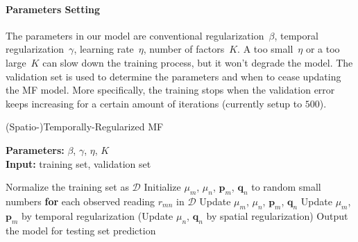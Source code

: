 \paragraph*{Parameters Setting}
The parameters in our model are conventional regularization~$\beta$, temporal regularization~$\gamma$, learning rate~$\eta$, number of factors~$K$.
A too small~$\eta$ or a too large~$K$ can slow down the training process, but it won't degrade the model.
The validation set is used to determine the parameters and when to cease updating the MF model. More specifically, the training stops when the validation error keeps increasing for a certain amount of iterations (currently setup to $500$). 

\begin{algorithm}
	\caption{(Spatio-)Temporally-Regularized MF}
	\label{alg:STRMF}
	\textbf{Parameters:} $\beta$, $\gamma$, $\eta$, $K$\\
	\textbf{Input:} training set, validation set
	\begin{algorithmic}
		\State Normalize the training set as $\mathcal{D}$
		\State Initialize $\mu_m$, $\mu_n$, $\mathbf{p}_m$, $\mathbf{q}_n$ to random small numbers
		\Repeat
			\State \textbf{for} each observed reading $r_{mn}$ in $\mathcal{D}$
				\State \indent Update $\mu_m$, $\mu_n$, $\mathbf{p}_{m}$, $\mathbf{q}_{n}$
			\State Update $\mu_m$, $\mathbf{p}_m$ by temporal regularization
			\State (Update $\mu_n$, $\mathbf{q}_n$ by spatial regularization)
		\State Output the model for testing set prediction
	\end{algorithmic}
\end{algorithm}
